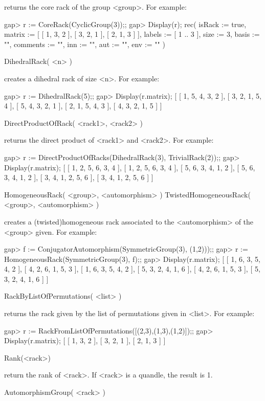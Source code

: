 returns the core rack of the group <group>. For example:

\beginexample
gap> r := CoreRack(CyclicGroup(3));;
gap> Display(r);
rec(
  isRack := true,
  matrix := [ [ 1, 3, 2 ], [ 3, 2, 1 ], [ 2, 1, 3 ] ],
  labels := [ 1 .. 3 ],
  size := 3,
  basis := "",
  comments := "",
  inn := "",
  aut := "",
  env := "" )
\endexample

\>DihedralRack( <n> ) 

creates a dihedral rack of size <n>. For example:

\beginexample
gap> r := DihedralRack(5);;
gap> Display(r.matrix);
[ [  1,  5,  4,  3,  2 ],
  [  3,  2,  1,  5,  4 ],
  [  5,  4,  3,  2,  1 ],
  [  2,  1,  5,  4,  3 ],
  [  4,  3,  2,  1,  5 ] ]
\endexample

\>DirectProductOfRack( <rack1>, <rack2> )

returns the direct product of <rack1> and <rack2>.
For example:

\beginexample
gap> r := DirectProductOfRacks(DihedralRack(3), TrivialRack(2));;
gap> Display(r.matrix);
[ [  1,  2,  5,  6,  3,  4 ],
  [  1,  2,  5,  6,  3,  4 ],
  [  5,  6,  3,  4,  1,  2 ],
  [  5,  6,  3,  4,  1,  2 ],
  [  3,  4,  1,  2,  5,  6 ],
  [  3,  4,  1,  2,  5,  6 ] ]
\endexample

\>HomogeneousRack( <group>, <automorphism> )
\>TwistedHomogeneousRack( <group>, <automorphism> )

creates a (twisted)homogeneous rack associated to the <automorphism> 
of the <group> given. For example:

\beginexample
gap> f := ConjugatorAutomorphism(SymmetricGroup(3), (1,2)));;
gap> r := HomogeneousRack(SymmetricGroup(3), f);;
gap> Display(r.matrix);
[ [  1,  6,  3,  5,  4,  2 ],
  [  4,  2,  6,  1,  5,  3 ],
  [  1,  6,  3,  5,  4,  2 ],
  [  5,  3,  2,  4,  1,  6 ],
  [  4,  2,  6,  1,  5,  3 ],
  [  5,  3,  2,  4,  1,  6 ] ]
\endexample

\>RackByListOfPermutations( <list> )

returns the rack given by the list of permutations given in <list>. For example:

\beginexample
gap> r := RackFromListOfPermutations([(2,3),(1,3),(1,2)]);;
gap> Display(r.matrix);
[ [  1,  3,  2 ],
  [  3,  2,  1 ],
  [  2,  1,  3 ] ]
\endexample

\>Rank(<rack>)

return the rank of <rack>. If <rack> is a quandle, the result is 1.

\>AutomorphismGroup( <rack> )

